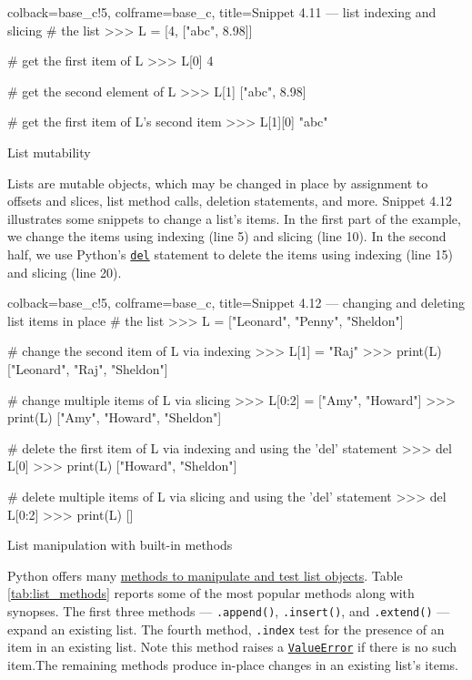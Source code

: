 \documentclass[a4paper,11pt]{book}
\numberwithin{figure}{chapter}
\numberwithin{table}{chapter}
\newcommand{\question}[1]{%
    \begin{tcolorbox}[colback=comp_c!10,colframe=comp_c,sidebyside align=top,width=\linewidth,before skip=1ex]
        #1
    \end{tcolorbox}
    \switchcolumn%
}
\newcommand{\note}[1]{%
    \begin{tcolorbox}[colback=white!0,colframe=white!10,width=\linewidth,before skip=1ex]
        #1
    \end{tcolorbox}
}
\begin{document}
\begin{pythoncode}[linenos=true,]{colback=base_c!5, colframe=base_c, title=\sffamily Snippet 4.11 --- list indexing and slicing}
# the list
>>> L = [4, ["abc", 8.98]]

# get the first item of L
>>> L[0]
4

 # get the second element of L
>>> L[1]
["abc", 8.98]

# get the first item of L's second item
>>> L[1][0]
"abc"

\end{pythoncode}

\begin{paracol}{2}
	\question{\raggedright List mutability}
	\note{Lists are mutable objects, which may be changed in place by assignment to offsets and slices, list method calls, deletion statements, and more. Snippet 4.12 illustrates some snippets to change a list's items. In the first part of the example, we change the items using indexing (line 5) and slicing (line 10). In the second half, we use Python's \href{https://docs.python.org/3/reference/simple_stmts.html}{\texttt{del}} statement to delete the items using indexing (line 15) and slicing (line 20).}
\end{paracol}

\begin{pythoncode}[linenos=true,]{colback=base_c!5, colframe=base_c, title=\sffamily Snippet 4.12 --- changing and deleting list items in place}
# the list
>>> L = ["Leonard", "Penny", "Sheldon"]

# change the second item of L via indexing
>>> L[1] = "Raj"
>>> print(L)
["Leonard", "Raj", "Sheldon"]

# change multiple items of L via slicing
>>> L[0:2] = ["Amy", "Howard"]
>>> print(L)
["Amy", "Howard", "Sheldon"]

# delete the first item of L via indexing and using the 'del' statement
>>> del L[0]
>>> print(L)
["Howard", "Sheldon"]

# delete multiple items of L via slicing and using the 'del' statement
>>> del L[0:2]
>>> print(L)
[]

\end{pythoncode}

\begin{paracol}{2}
\question{\raggedright List manipulation with built-in methods}
\note{Python offers many \href{https://docs.python.org/3/tutorial/datastructures.html}{methods to manipulate and test list objects}. Table \ref{tab:list_methods} reports some of the most popular methods along with synopses. The first three methods --- \texttt{.append()}, \texttt{.insert()}, and \texttt{.extend()} --- expand an existing list. The fourth method, \texttt{.index} test for the presence of an item in an existing list. Note this method raises a \href{https://docs.python.org/3/library/exceptions.html\#ValueError}{\texttt{ValueError}} if there is no such item.The remaining methods produce in-place changes in an existing list's items.}
\end{paracol}
\end{document}
